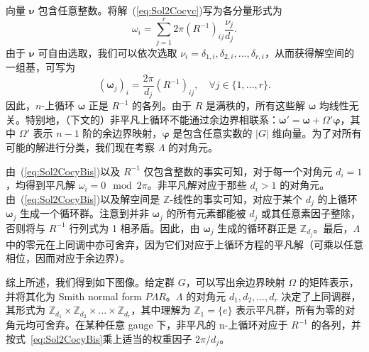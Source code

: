 向量 $\bm{\nu}$ 包含任意整数。将解~(\ref{eq:Sol2Cocyc})写为各分量形式为
\begin{equation}
	\omega_i = \sum_{j=1}^r 2\pi\left(R^{-1}\right)_{ij}\frac{\nu_j}{d_j}.
	\label{eq:Sol2CocyBis}
\end{equation}
由于 $\bm{\nu}$ 可自由选取，我们可以依次选取 $\nu_i = \delta_{1,i}, \delta_{2,i},...,\delta_{r,i}$，从而获得解空间的一组基，可写为
\begin{equation}
	(\bm{\omega}_j)_i = \frac{2\pi}{d_j}\left(R^{-1}\right)_{ij}, \quad \forall j\in\{1,...,r\}.
\end{equation}
因此，$n$-上循环 $\bm{\omega}$ 正是 $R^{-1}$ 的各列。由于 $R$ 是满秩的，所有这些解 $\bm{\omega}$ 均线性无关。特别地，（下文的）非平凡上循环不能通过余边界相联系：$\bm{\omega}'=\bm{\omega} + \Omega'\bm{\varphi}$，其中 $\Omega'$ 表示 $n-1$ 阶的余边界映射，$\bm{\varphi}$ 是包含任意实数的 $|G|$ 维向量。为了对所有可能的解进行分类，我们现在考察 $\Lambda$ 的对角元。

由~(\ref{eq:Sol2CocyBis})以及 $R^{-1}$ 仅包含整数的事实可知，对于每一个对角元 $d_i=1$，均得到平凡解 $\omega_i=0 \mod 2\pi$。非平凡解对应于那些 $d_i>1$ 的对角元。由~(\ref{eq:Sol2CocyBis})以及解空间是 $\mathbb{Z}$-线性的事实可知，对应于某个 $d_j$ 的上循环 $\bm{\omega}_j$ 生成一个循环群。注意到并非 $\bm{\omega}_j$ 的所有元素都能被 $d_j$ 或其任意素因子整除，否则将与 $R^{-1}$ 行列式为 1 相矛盾。因此，由 $\bm{\omega}_j$ 生成的循环群正是 $\mathbb{Z}_{d_j}$。最后，$\Lambda$ 中的零元在上同调中亦可舍弃，因为它们对应于上循环方程的平凡解（可乘以任意相位，因而对应于余边界）。

综上所述，我们得到如下图像。给定群 $G$，可以写出余边界映射 $\Omega$ 的矩阵表示，并将其化为 Smith normal form $P\Lambda R$。$\Lambda$ 的对角元 $d_1,d_2,...,d_r$ 决定了上同调群，其形式为 $\mathbb{Z}_{d_1}\times\mathbb{Z}_{d_2}\times ... \times \mathbb{Z}_{d_r}$，其中理解为 $\mathbb{Z}_1=\{e\}$ 表示平凡群，所有为零的对角元均可舍弃。在某种任意 gauge 下，非平凡的 n-上循环对应于 $R^{-1}$ 的各列，并按式~\cref{eq:Sol2CocyBis}乘上适当的权重因子 $2\pi/d_j$。